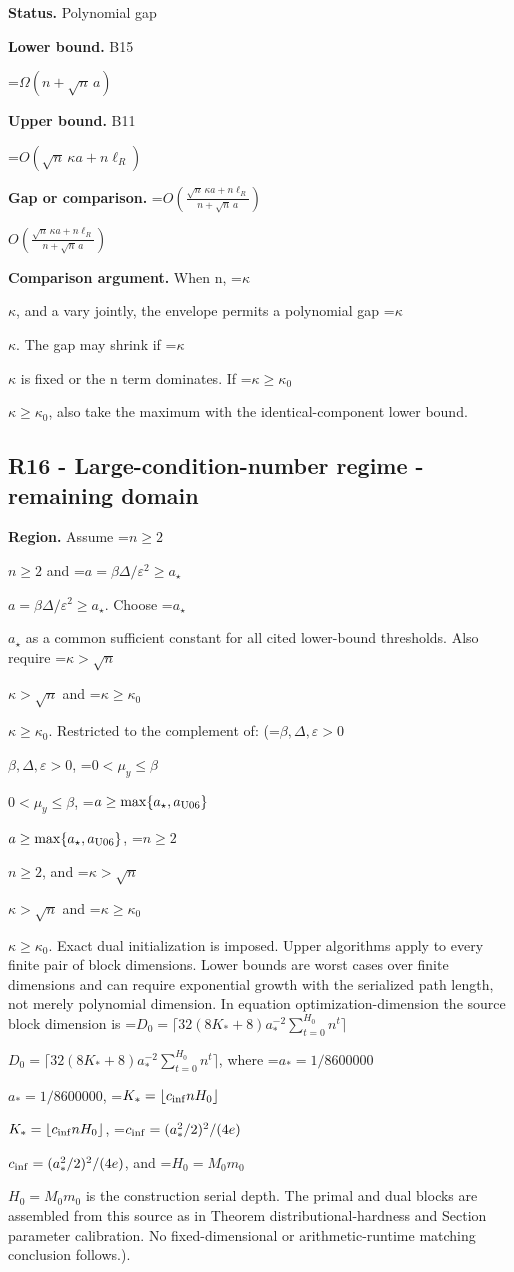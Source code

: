 \documentclass[10pt,a4paper]{article}
\newcommand{\AtlasMath}[1]{\par\begingroup\centering\setbox0=\hbox{$\displaystyle #1$}\ifdim\wd0>1.4\linewidth\typeout{ATLAS WIDE FORMULA: \the\wd0}\fi\ifdim\wd0>\linewidth\resizebox{\linewidth}{!}{\box0}\else\box0\fi\par\endgroup}
\newcommand{\AtlasInlineMath}[1]{\begingroup\setbox0=\hbox{$#1$}\ifdim\wd0>.4\linewidth\endgroup\AtlasMath{#1}\else\endgroup$#1$\fi}
\begin{document}
\textbf{Status.} Polynomial gap



\textbf{Lower bound.} B15



\AtlasMath{\Omega(n+\sqrt n\,a)}


\textbf{Upper bound.} B11



\AtlasMath{O(\sqrt n\,\kappa a+n\ell_R)}


\textbf{Gap or comparison.} \AtlasInlineMath{O\!\left(\frac{\sqrt n\,\kappa a+n\ell_R}{n+\sqrt n\,a}\right)}



\textbf{Comparison argument.} When n, \AtlasInlineMath{\kappa}, and a vary jointly, the envelope permits a polynomial gap \AtlasInlineMath{\kappa}. The gap may shrink if \AtlasInlineMath{\kappa} is fixed or the n term dominates. If \AtlasInlineMath{\kappa\ge\kappa_0}, also take the maximum with the identical-component lower bound.



\subsection{R16 - Large-condition-number regime - remaining domain}


\textbf{Region.} Assume \AtlasInlineMath{n\ge2} and \AtlasInlineMath{a=\beta\Delta/\varepsilon^2\ge a_\star}. Choose \AtlasInlineMath{a_\star} as a common sufficient constant for all cited lower-bound thresholds. Also require \AtlasInlineMath{\kappa>\sqrt n} and \AtlasInlineMath{\kappa\ge\kappa_0}. Restricted to the complement of: (\AtlasInlineMath{\beta,\Delta,\varepsilon>0}, \AtlasInlineMath{0<\mu_y\le\beta}, \AtlasInlineMath{a\ge\max\{a_\star,a_{\rm U06}\}}, \AtlasInlineMath{n\ge2}, and \AtlasInlineMath{\kappa>\sqrt n} and \AtlasInlineMath{\kappa\ge\kappa_0}. Exact dual initialization is imposed. Upper algorithms apply to every finite pair of block dimensions. Lower bounds are worst cases over finite dimensions and can require exponential growth with the serialized path length, not merely polynomial dimension. In equation optimization-dimension the source block dimension is \AtlasInlineMath{D_0=\lceil32(8K_*+8)a_*^{-2}\sum_{t=0}^{H_0}n^t\rceil}, where \AtlasInlineMath{a_*=1/8600000}, \AtlasInlineMath{K_*=\lfloor c_{\rm inf}nH_0\rfloor}, \AtlasInlineMath{c_{\rm inf}=(a_*^2/2)^2/(4e)}, and \AtlasInlineMath{H_0=M_0m_0} is the construction serial depth. The primal and dual blocks are assembled from this source as in Theorem distributional-hardness and Section parameter calibration. No fixed-dimensional or arithmetic-runtime matching conclusion follows.).
\end{document}
